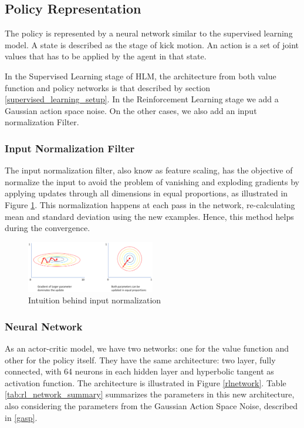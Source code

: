 \subsection{Policy Representation}

The policy is represented by a neural network similar to the supervised learning model. A state is described as the stage of kick motion. An action is a set of joint values that has to be applied by the agent in that state.

In the Supervised Learning stage of HLM, the architecture from both value function and policy networks is that described by section \ref{supervised_learning_setup}. In the Reinforcement Learning stage we add a Gaussian action space noise. On the other cases, we also add an input normalization Filter.

\subsubsection{Input Normalization Filter}\label{sec:inputnorm}
The input normalization filter, also know as feature scaling, has the objective of normalize the input to avoid the problem of vanishing and exploding gradients by applying updates through all dimensions in equal proportions, as illustrated in Figure \ref{inputnormfig}. This normalization happens at each pass in the network, re-calculating mean and standard deviation using the new examples. Hence, this method helps during the convergence.

\begin{figure}[!htbp]
	\centering
	\includegraphics[width=0.5\textwidth]{Cap5/inputnorm.eps}
	\caption{Intuition behind input normalization}
	\label{inputnormfig}
\end{figure}

\subsubsection{Neural Network}
As an actor-critic model, we have two networks: one for the value function and other for the policy itself. They have the same architecture: two layer, fully connected, with 64 neurons in each hidden layer and hyperbolic tangent as activation function. The architecture is illustrated in Figure \ref{rlnetwork}. Table \ref{tab:rl_network_summary} summarizes the parameters in this new architecture, also considering the parameters from the Gaussian Action Space Noise, described in \ref{gasp}.

